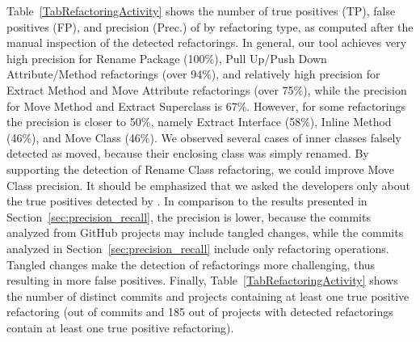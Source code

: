 Table~\ref{TabRefactoringActivity} shows the number of true positives (TP), false positives (FP), and precision (Prec.) of \toolName by refactoring type,
as computed after the manual inspection of the detected refactorings.
In general, our tool achieves very high precision for {\textsc Rename Package} (100\%), {\textsc Pull Up/Push Down Attribute/Method} refactorings (over 94\%),
and relatively high precision for {\textsc Extract Method} and {\textsc Move Attribute} refactorings (over 75\%),
while the precision for {\textsc Move Method} and {\textsc Extract Superclass} is 67\%.
However, for some refactorings the precision is closer to 50\%, namely {\textsc Extract Interface} (58\%), {\textsc Inline Method} (46\%),
and {\textsc Move Class} (46\%).
We observed several cases of inner classes falsely detected as moved, because their enclosing class was simply renamed.
By supporting the detection of {\textsc Rename Class} refactoring, we could improve {\textsc Move Class} precision.
It should be emphasized that we asked the developers only about the true positives detected by \toolName.
In comparison to the results presented in Section~\ref{sec:precision_recall}, the precision is lower,
because the commits analyzed from GitHub projects may include tangled changes, while the commits analyzed in Section~\ref{sec:precision_recall} include only refactoring operations.
Tangled changes make the detection of refactorings more challenging, thus resulting in more false positives.
Finally, Table~\ref{TabRefactoringActivity} shows the number of distinct commits and projects 
containing at least one true positive refactoring
(\commitsWithTruePositiveRefactoring out of \commitsWithDetectedRefactoring commits and 185 out of  projects with detected refactorings contain at least one true positive refactoring).

